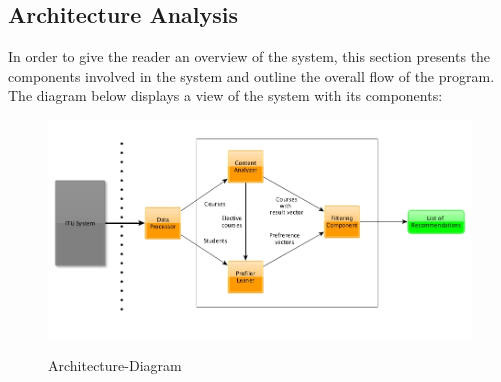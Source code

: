 

\subsection{Architecture Analysis}
In order to give the reader an overview of the system, this section presents the components involved in the system and outline the overall flow of the program. The diagram below displays a view of the system with its components: 

\begin{figure}[H]
\centering
\includegraphics[scale=0.5]{Pictures/Architecture-Diagram.jpg}
\label{Architecture-Diagram}
\caption{Architecture-Diagram}
\end{figure}


